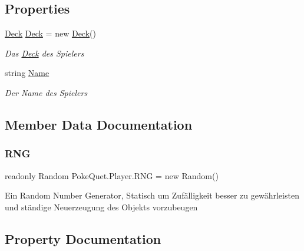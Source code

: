 \subsection*{Properties}
\begin{DoxyCompactItemize}
\item 
\mbox{\hyperlink{class_poke_quet_1_1_deck}{Deck}} \mbox{\hyperlink{class_poke_quet_1_1_player_af3e3987ecb9c2a43d233975e3cc414ff}{Deck}} = new \mbox{\hyperlink{class_poke_quet_1_1_deck}{Deck}}()
\begin{DoxyCompactList}\small\item\em Das \mbox{\hyperlink{class_poke_quet_1_1_deck}{Deck}} des Spielers \end{DoxyCompactList}\item 
string \mbox{\hyperlink{class_poke_quet_1_1_player_a2ccd0df63845bdec5e75d80df2748ab5}{Name}}
\begin{DoxyCompactList}\small\item\em Der Name des Spielers \end{DoxyCompactList}\end{DoxyCompactItemize}


\subsection{Member Data Documentation}
\mbox{\label{class_poke_quet_1_1_player_a0ea964b34febb9e63ed847d944ffcadf}} 
\subsubsection{\texorpdfstring{R\+NG}{RNG}}
{\footnotesize\ttfamily readonly Random Poke\+Quet.\+Player.\+R\+NG = new Random()\hspace{0.3cm}{\ttfamily [static]}}



Ein Random Number Generator, Statisch um Zufälligkeit besser zu gewährleisten und ständige Neuerzeugung des Objekts vorzubeugen 



\subsection{Property Documentation}
\mbox{\label{class_poke_quet_1_1_player_af3e3987ecb9c2a43d233975e3cc414ff}} 
